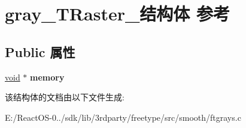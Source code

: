 \hypertarget{structgray___t_raster__}{}\section{gray\+\_\+\+T\+Raster\+\_\+结构体 参考}
\label{structgray___t_raster__}
\subsection*{Public 属性}
\begin{DoxyCompactItemize}
\item 
\mbox{\label{structgray___t_raster___a0c3c49aa10fa5c1e8c6e40199b04ff87}} 
\hyperlink{interfacevoid}{void} $\ast$ {\bfseries memory}
\end{DoxyCompactItemize}


该结构体的文档由以下文件生成\+:\begin{DoxyCompactItemize}
\item 
E\+:/\+React\+O\+S-\/0../sdk/lib/3rdparty/freetype/src/smooth/ftgrays.\+c\end{DoxyCompactItemize}
